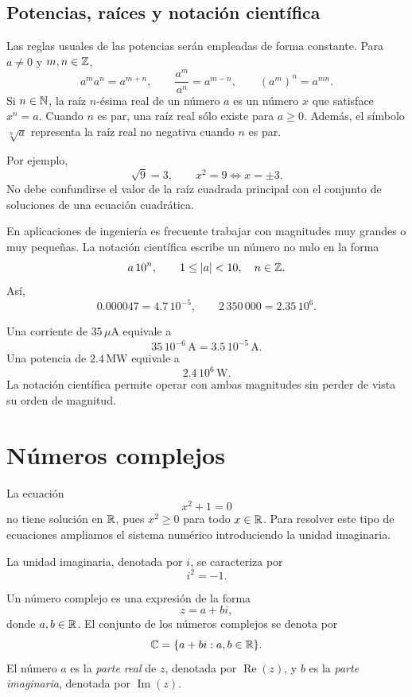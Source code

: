 \subsection{Potencias, raíces y notación científica}

Las reglas usuales de las potencias serán empleadas de forma constante. Para \(a\neq0\) y \(m,n\in\mathbb{Z}\),
\[
a^m a^n=a^{m+n},
\qquad
\frac{a^m}{a^n}=a^{m-n},
\qquad
(a^m)^n=a^{mn}.
\]
Si \(n\in\mathbb{N}\), la raíz \(n\)-ésima real de un número \(a\) es un número \(x\) que satisface \(x^n=a\). Cuando \(n\) es par, una raíz real sólo existe para \(a\geq0\). Además, el símbolo \(\sqrt[n]{a}\) representa la raíz real no negativa cuando \(n\) es par.

Por ejemplo,
\[
\sqrt{9}=3,
\qquad
x^2=9\Longleftrightarrow x=\pm3.
\]
No debe confundirse el valor de la raíz cuadrada principal con el conjunto de soluciones de una ecuación cuadrática.

En aplicaciones de ingeniería es frecuente trabajar con magnitudes muy grandes o muy pequeñas. La notación científica escribe un número no nulo en la forma
\[
a\,10^n,\qquad 1\leq |a|<10,\quad n\in\mathbb{Z}.
\]
Así,
\[
0.000047=4.7\,10^{-5},
\qquad
2\,350\,000=2.35\,10^6.
\]

\begin{example}
Una corriente de \(35\,\mu\mathrm{A}\) equivale a
\[
35\,10^{-6}\,\mathrm{A}=3.5\,10^{-5}\,\mathrm{A}.
\]
Una potencia de \(2.4\,\mathrm{MW}\) equivale a
\[
2.4\,10^6\,\mathrm{W}.
\]
La notación científica permite operar con ambas magnitudes sin perder de vista su orden de magnitud.
\end{example}

\section{Números complejos}
\label{sec:complejos}

La ecuación
\[
x^2+1=0
\]
no tiene solución en \(\mathbb{R}\), pues \(x^2\geq0\) para todo \(x\in\mathbb{R}\). Para resolver este tipo de ecuaciones ampliamos el sistema numérico introduciendo la unidad imaginaria.

\begin{definition}
La unidad imaginaria, denotada por \(i\), se caracteriza por
\[
i^2=-1.
\]
\end{definition}

\begin{definition}
Un número complejo es una expresión de la forma
\[
z=a+bi,
\]
donde \(a,b\in\mathbb{R}\). El conjunto de los números complejos se denota por
\[
\mathbb{C}=\{a+bi:a,b\in\mathbb{R}\}.
\]
El número \(a\) es la \emph{parte real} de \(z\), denotada por \(\operatorname{Re}(z)\), y \(b\) es la \emph{parte imaginaria}, denotada por \(\operatorname{Im}(z)\).
\end{definition}


